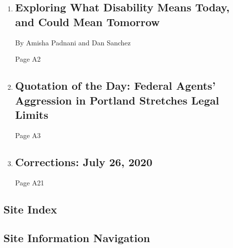 \begin{enumerate}
\def\labelenumi{\arabic{enumi}.}
\item
  \href{/2020/07/20/insider/disability-ADA.html}{}

  \hypertarget{exploring-what-disability-means-today-and-could-mean-tomorrow}{%
  \subsection{Exploring What Disability Means Today, and Could Mean
  Tomorrow}\label{exploring-what-disability-means-today-and-could-mean-tomorrow}}

  By Amisha Padnani and Dan Sanchez

  Page A2
\item
  \href{/2020/07/26/todayspaper/quotation-of-the-day-federal-agents-aggression-in-portland-stretches-legal-limits.html}{}

  \hypertarget{quotation-of-the-day-federal-agents-aggression-in-portland-stretches-legal-limits}{%
  \subsection{Quotation of the Day: Federal Agents' Aggression in
  Portland Stretches Legal
  Limits}\label{quotation-of-the-day-federal-agents-aggression-in-portland-stretches-legal-limits}}

  Page A3
\item
  \href{/2020/07/26/pageoneplus/corrections-july-26-2020.html}{}

  \hypertarget{corrections-july-26-2020}{%
  \subsection{Corrections: July 26,
  2020}\label{corrections-july-26-2020}}

  Page A21
\end{enumerate}

\hypertarget{site-index}{%
\subsection{Site Index}\label{site-index}}

\hypertarget{site-information-navigation}{%
\subsection{Site Information
Navigation}\label{site-information-navigation}}

